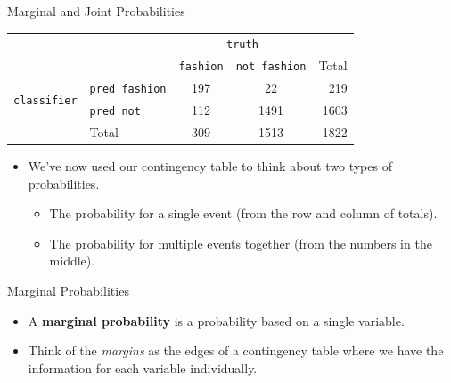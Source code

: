 \begin{frame}{Marginal and Joint Probabilities}
    \begin{center}
        \begin{tabular}{r l cc r}
		& & \multicolumn{2}{c}{{\texttt{truth}}} & \\
        \cline{3-4}
		& & \texttt{fashion} & \texttt{not fashion} & Total  \\ 
        \cline{2-5}
        \multirow{2}{*}{{\texttt{classifier}}} 
        & \texttt{pred fashion}   & 197 & 22 & 219 \\ 
  		& \texttt{pred not}       & 112 & 1491 & 1603 \\ 
        \cline{2-5}
  		& Total	& 309 & 1513 & 1822 \\
        \cline{2-5}
    \end{tabular}
    \end{center}
    \begin{itemize}
        \item We've now used our contingency table to think about two types of probabilities.
        \begin{itemize}
            \item The probability for a single event (from the row and column of totals).
            \item The probability for multiple events together (from the numbers in the middle).
        \end{itemize}
    \end{itemize}
\end{frame}

\begin{frame}{Marginal Probabilities}
    \begin{itemize}
        \item A \textbf{marginal probability} is a probability based on a single variable.
        \item Think of the \textit{margins} as the edges of a contingency table where we have the information for each variable individually.
    \end{itemize}
\end{frame}

